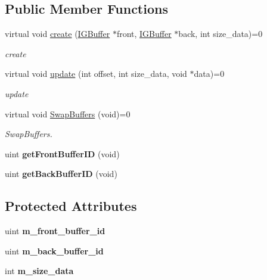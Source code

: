 \subsection*{Public Member Functions}
\begin{DoxyCompactItemize}
\item 
virtual void \hyperlink{classEngine_1_1IGDoubleBuffer_a094e87543bb24956ec1fd3835b4ca413}{create} (\hyperlink{classEngine_1_1IGBuffer}{I\+G\+Buffer} $\ast$front, \hyperlink{classEngine_1_1IGBuffer}{I\+G\+Buffer} $\ast$back, int size\+\_\+data)=0
\begin{DoxyCompactList}\small\item\em create \end{DoxyCompactList}\item 
virtual void \hyperlink{classEngine_1_1IGDoubleBuffer_a39b0608ee6f5ddbf14dbea9030b881d8}{update} (int offset, int size\+\_\+data, void $\ast$data)=0
\begin{DoxyCompactList}\small\item\em update \end{DoxyCompactList}\item 
virtual void \hyperlink{classEngine_1_1IGDoubleBuffer_ade7c5ce0b5883c55f5e66588dd8b14da}{Swap\+Buffers} (void)=0
\begin{DoxyCompactList}\small\item\em Swap\+Buffers. \end{DoxyCompactList}\item 
\hypertarget{classEngine_1_1IGDoubleBuffer_aceed4fb6fb4c4a2d1250ded26a28efd2}{}uint {\bfseries get\+Front\+Buffer\+I\+D} (void)\label{classEngine_1_1IGDoubleBuffer_aceed4fb6fb4c4a2d1250ded26a28efd2}

\item 
\hypertarget{classEngine_1_1IGDoubleBuffer_a724bc8379533fb5b245fd32447188d03}{}uint {\bfseries get\+Back\+Buffer\+I\+D} (void)\label{classEngine_1_1IGDoubleBuffer_a724bc8379533fb5b245fd32447188d03}

\end{DoxyCompactItemize}
\subsection*{Protected Attributes}
\begin{DoxyCompactItemize}
\item 
\hypertarget{classEngine_1_1IGDoubleBuffer_a092ac82c99c506737a6c8dc6908d89c2}{}uint {\bfseries m\+\_\+front\+\_\+buffer\+\_\+id}\label{classEngine_1_1IGDoubleBuffer_a092ac82c99c506737a6c8dc6908d89c2}

\item 
\hypertarget{classEngine_1_1IGDoubleBuffer_a658ad8de4c92a70b57ecb0c8d6517121}{}uint {\bfseries m\+\_\+back\+\_\+buffer\+\_\+id}\label{classEngine_1_1IGDoubleBuffer_a658ad8de4c92a70b57ecb0c8d6517121}

\item 
\hypertarget{classEngine_1_1IGDoubleBuffer_a42e859171e27646ace0e000a8a26ac16}{}int {\bfseries m\+\_\+size\+\_\+data}\label{classEngine_1_1IGDoubleBuffer_a42e859171e27646ace0e000a8a26ac16}

\end{DoxyCompactItemize}


